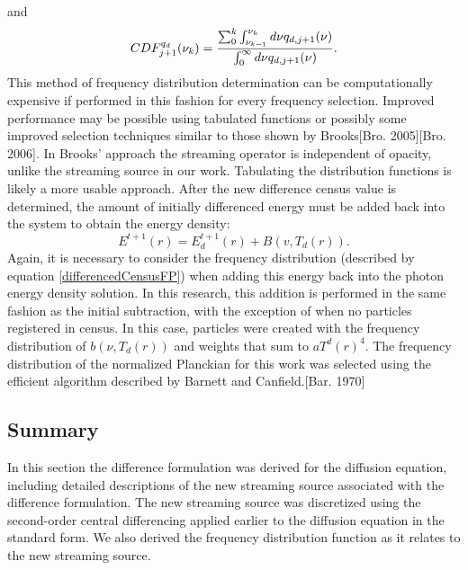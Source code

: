 	and
	\begin{equation}
	\label{CDF_q_d_j+1}
	CDF^{q_d}_{j+1}(\nu_k)={\sum_0^k\int^{\nu_k}_{\nu_{k-1}}d\nu q_{d,{j+1}}(\nu)\over{\int^\infty_0d\nu q_{d,{j+1}}(\nu)}}.
	\end{equation}
	This method of frequency distribution determination can be computationally expensive if performed in this fashion for every frequency selection. Improved performance may be possible using tabulated functions or possibly some improved selection techniques similar to those shown by Brooks[Bro. 2005][Bro. 2006]. In Brooks' approach the streaming operator is independent of opacity, unlike the streaming source in our work. Tabulating the distribution functions is likely a more usable approach. After the new difference census value is determined, the amount of initially differenced energy must be added back into the system to obtain the energy density:
	\begin{equation}
	\label{finalEnergyDensity}
	E^{t+1}(r)=E^{t+1}_{d}(r)+B{(v,T_{d}(r))}.
	\end{equation}
	Again, it is necessary to consider the frequency distribution (described by equation \ref{differencedCensusFP}) when adding this energy back into the photon energy density solution. In this research, this addition is performed in the same fashion as the initial subtraction, with the exception of when no particles registered in census. In this case, particles were created with the frequency distribution of $b(\nu,T_d(r))$ and weights that sum to $aT^d(r)^4$. The frequency distribution of the normalized Planckian for this work was selected using the efficient algorithm described by Barnett and Canfield.[Bar. 1970] 
	

\belowSubSecSkip


\subsection{Summary}
\label{sec:DifferenceFormulation-Summary}

\noindent
	\indent In this section the difference formulation was derived for the diffusion equation, including detailed descriptions of the new streaming source associated with the difference formulation. The new streaming source was discretized using the second-order central differencing applied earlier to the diffusion equation in the standard form. We also derived the frequency distribution function as it relates to the new streaming source.

